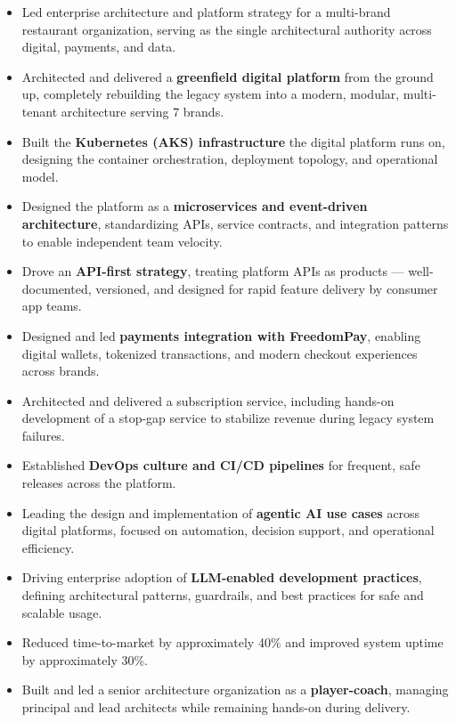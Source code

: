 \documentclass[11pt]{article}
\begin{document}
\begin{itemize}
  \item Led enterprise architecture and platform strategy for a multi-brand restaurant organization, serving as the single architectural authority across digital, payments, and data.
  \item Architected and delivered a \textbf{greenfield digital platform} from the ground up, completely rebuilding the legacy system into a modern, modular, multi-tenant architecture serving 7 brands.
  \item Built the \textbf{Kubernetes (AKS) infrastructure} the digital platform runs on, designing the container orchestration, deployment topology, and operational model.
  \item Designed the platform as a \textbf{microservices and event-driven architecture}, standardizing APIs, service contracts, and integration patterns to enable independent team velocity.
  \item Drove an \textbf{API-first strategy}, treating platform APIs as products --- well-documented, versioned, and designed for rapid feature delivery by consumer app teams.
  \item Designed and led \textbf{payments integration with FreedomPay}, enabling digital wallets, tokenized transactions, and modern checkout experiences across brands.
  \item Architected and delivered a subscription service, including hands-on development of a stop-gap service to stabilize revenue during legacy system failures.
  \item Established \textbf{DevOps culture and CI/CD pipelines} for frequent, safe releases across the platform.
  \item Leading the design and implementation of \textbf{agentic AI use cases} across digital platforms, focused on automation, decision support, and operational efficiency.
  \item Driving enterprise adoption of \textbf{LLM-enabled development practices}, defining architectural patterns, guardrails, and best practices for safe and scalable usage.
  \item Reduced time-to-market by approximately 40\% and improved system uptime by approximately 30\%.
  \item Built and led a senior architecture organization as a \textbf{player-coach}, managing principal and lead architects while remaining hands-on during delivery.
\end{itemize}
\end{document}
